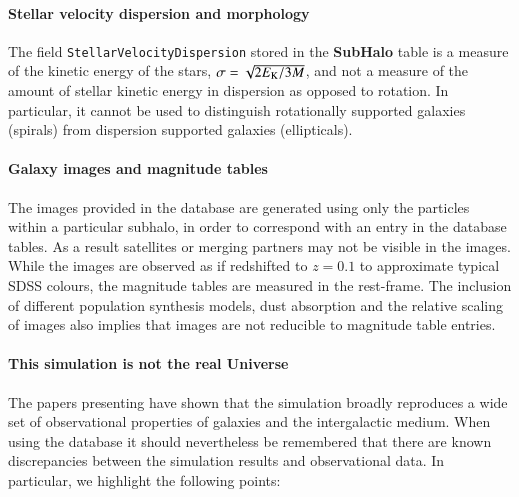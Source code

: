 \paragraph{\bf Stellar velocity dispersion and morphology}
The field {\tt StellarVelocityDispersion} stored in the {\bf SubHalo} table
is a measure of the kinetic energy of the stars, $\sigma = \sqrt{2 E_{\rm{K}} /
  3 M}$, and not a measure of the amount of stellar kinetic energy in dispersion
as opposed to rotation. In particular, it cannot be used to distinguish
rotationally supported galaxies (spirals) from dispersion supported galaxies
(ellipticals).

\paragraph{\bf Galaxy images and magnitude tables}
The images provided in the database are generated using only the particles
within a particular subhalo, in order to correspond with an entry in the
database tables. As a result satellites or merging partners may not be visible
in the images. While the images are observed as if redshifted to $z=0.1$ to
approximate typical SDSS colours, the magnitude tables are measured in the
rest-frame. The inclusion of different population synthesis models, dust
absorption and the relative scaling of images also implies that images are not
reducible to magnitude table entries. 

\paragraph{\bf This simulation is not the real Universe} 
The papers presenting \eagle have shown that the simulation broadly reproduces a
wide set of observational properties of galaxies and the intergalactic
medium. When using the database it should nevertheless be remembered that there
are known discrepancies between the simulation results and observational
data. In particular, we highlight the following points:


